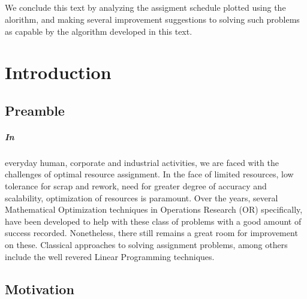 \documentclass[a4paper,openany]{book}
\begin{document}
		\paragraph{}
		We conclude this text by analyzing the assigment schedule plotted using the alorithm, and making several improvement suggestions to solving such problems as capable by the algorithm developed in this text.
		
	\setcounter{tocdepth}{1}
	\tableofcontents
	\listoftables
	\mainmatter
    \chapter{Introduction}
        \section{Preamble}
        \paragraph{In}
			everyday human, corporate and industrial activities, we are faced with the challenges of optimal resource assignment. In the face of limited resources, low tolerance for scrap and rework, need for greater degree of accuracy and scalability, optimization of resources is paramount.
            Over the years, several Mathematical Optimization techniques in Operations Research (OR) specifically, have been developed to help with these class of problems with a good amount of success recorded. Nonetheless, there still remains a great room for improvement on these. Classical approaches to solving assignment problems, among others include the well revered Linear Programming techniques.
		\section{Motivation}
\end{document}
